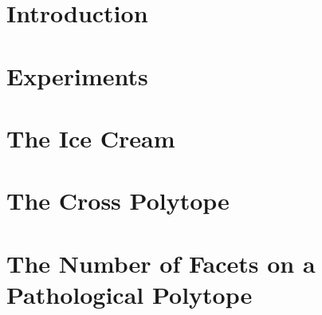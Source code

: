 \documentclass[notitlepage]{report}
\begin{document}


\newpage

\tableofcontents

\chapter{Introduction}



\chapter{Experiments}



\appendix
\chapter{The Ice Cream} \label{app_ice_cream}



\chapter{The Cross Polytope} \label{app_cross_polytope}



\chapter{The Number of Facets on a Pathological Polytope} \label{app_cyclic_polytope}




%



\end{document}
